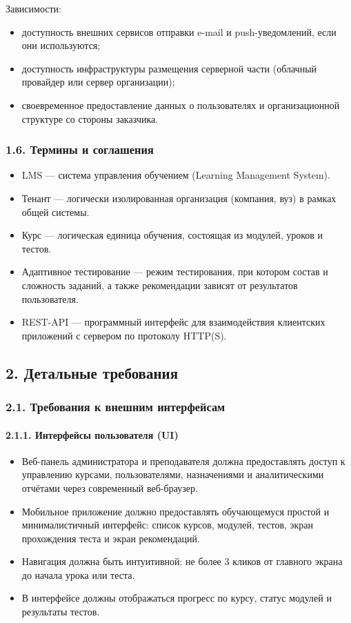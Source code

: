\documentclass{G7-32}
\begin{document}
Зависимости:
\begin{itemize}
  \item доступность внешних сервисов отправки e-mail и push-уведомлений, если они используются;
  \item доступность инфраструктуры размещения серверной части (облачный провайдер или сервер организации);
  \item своевременное предоставление данных о пользователях и организационной структуре со стороны заказчика.
\end{itemize}

\subsubsection*{1.6. Термины и соглашения}

\begin{itemize}
  \item LMS — система управления обучением (Learning Management System).
  \item Тенант — логически изолированная организация (компания, вуз) в рамках общей системы.
  \item Курс — логическая единица обучения, состоящая из модулей, уроков и тестов.
  \item Адаптивное тестирование — режим тестирования, при котором состав и сложность заданий, а также рекомендации зависят от результатов пользователя.
  \item REST-API — программный интерфейс для взаимодействия клиентских приложений с сервером по протоколу HTTP(S).
\end{itemize}

\subsection*{2. Детальные требования}

\subsubsection*{2.1. Требования к внешним интерфейсам}

\paragraph{2.1.1. Интерфейсы пользователя (UI)}

\begin{itemize}
  \item Веб-панель администратора и преподавателя должна предоставлять доступ к управлению курсами, пользователями, назначениями и аналитическими отчётами через современный веб-браузер.
  \item Мобильное приложение должно предоставлять обучающемуся простой и минималистичный интерфейс: список курсов, модулей, тестов, экран прохождения теста и экран рекомендаций.
  \item Навигация должна быть интуитивной: не более 3 кликов от главного экрана до начала урока или теста.
  \item В интерфейсе должны отображаться прогресс по курсу, статус модулей и результаты тестов.
\end{itemize}
\end{document}
